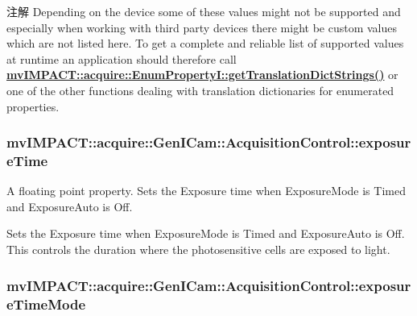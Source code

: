\begin{DoxyNote}{注解}
Depending on the device some of these values might not be supported and especially when working with third party devices there might be custom values which are not listed here. To get a complete and reliable list of supported values at runtime an application should therefore call {\bfseries \hyperlink{classmv_i_m_p_a_c_t_1_1acquire_1_1_enum_property_i_a0ba6ccbf5ee69784d5d0b537924d26b6}{mv\+I\+M\+P\+A\+C\+T\+::acquire\+::\+Enum\+Property\+I\+::get\+Translation\+Dict\+Strings()}} or one of the other functions dealing with translation dictionaries for enumerated properties. 
\end{DoxyNote}
\hypertarget{classmv_i_m_p_a_c_t_1_1acquire_1_1_gen_i_cam_1_1_acquisition_control_a3c77b0606062196e0bdd0e1a526e9d27}{
\subsubsection[{exposure\+Time}]{ mv\+I\+M\+P\+A\+C\+T\+::acquire\+::\+Gen\+I\+Cam\+::\+Acquisition\+Control\+::exposure\+Time}}\label{classmv_i_m_p_a_c_t_1_1acquire_1_1_gen_i_cam_1_1_acquisition_control_a3c77b0606062196e0bdd0e1a526e9d27}


A floating point property. Sets the Exposure time when Exposure\+Mode is Timed and Exposure\+Auto is Off. 

Sets the Exposure time when Exposure\+Mode is Timed and Exposure\+Auto is Off. This controls the duration where the photosensitive cells are exposed to light. \hypertarget{classmv_i_m_p_a_c_t_1_1acquire_1_1_gen_i_cam_1_1_acquisition_control_a98235de35e157788e0ca8618f2cf06e5}{
\subsubsection[{exposure\+Time\+Mode}]{ mv\+I\+M\+P\+A\+C\+T\+::acquire\+::\+Gen\+I\+Cam\+::\+Acquisition\+Control\+::exposure\+Time\+Mode}}\label{classmv_i_m_p_a_c_t_1_1acquire_1_1_gen_i_cam_1_1_acquisition_control_a98235de35e157788e0ca8618f2cf06e5}


